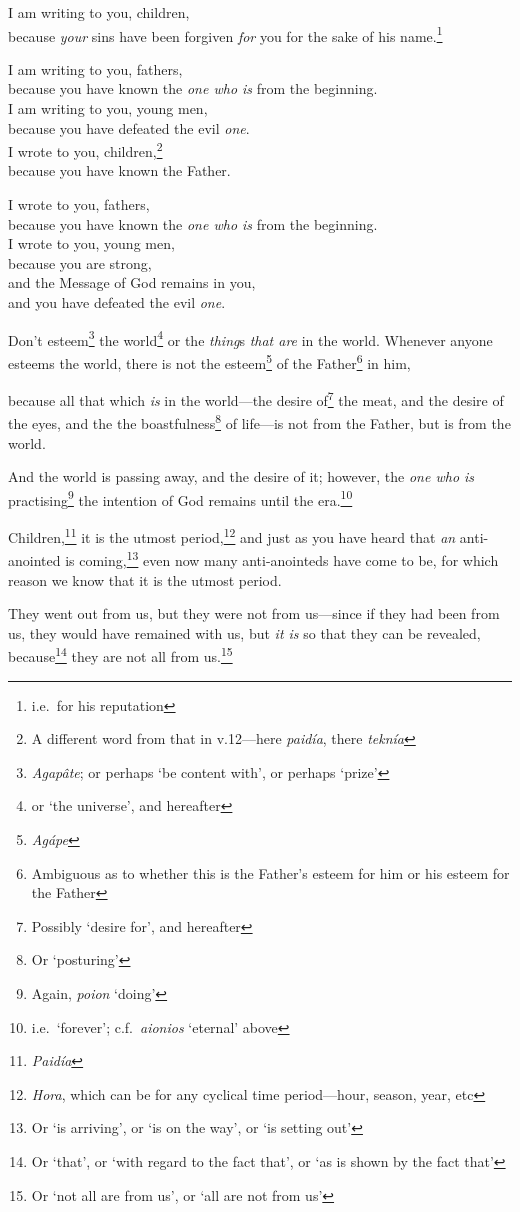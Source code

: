 \documentclass[article]{memoir}%
\newcounter{vnum}
\newcommand{\vnum}{%
	\textsuperscript{\thevnum}%
	\addtocounter{vnum}{1}%
}
\newcommand{\infer}[1]{\textit{#1}}
\newcommand{\focus}[1]{{#1}}
\newcommand{\lx}[1]{\textit{#1}}
\newcommand{\lxx}[2]{\textit{#1} `#2'}
\begin{document}
\indent \vnum I am writing to you, children,\\
\indent \indent because \infer{your} sins have been forgiven \infer{for} you for the sake of his name.\footnote{i.e.\ for his reputation} \\
\indent \vnum I am writing to you, fathers,\\
\indent \indent because you have known the \infer{one who is} from the beginning.\\
\indent I am writing to you, young men,\\
\indent \indent because you have defeated the evil \infer{one}.\\
\indent I wrote to you, children,\footnote{A different word from that in v.12---here \lx{paidía}, there \lx{teknía}}\\
\indent \indent because you have known the Father.\\
\indent \vnum I wrote to you, fathers,\\
\indent \indent because you have known the \infer{one who is} from the beginning.\\
\indent I wrote to you, young men,\\
\indent \indent because you are strong,\\
\indent \indent \indent and the Message of God remains in you,\\
\indent \indent \indent and you have defeated the evil \infer{one}.

\vnum Don't esteem\footnote{\lx{Agapâte}; or perhaps `be content with', or perhaps `prize'} the world\footnote{or `the universe', and hereafter} or the \infer{thing}s\infer{ that are} in the world. Whenever anyone esteems the world, there is not the esteem\footnote{\lx{Agápe}} of the Father\footnote{Ambiguous as to whether this is the Father's esteem for him or his esteem for the Father} in him, \vnum because all that which \infer{is} in the world---the desire of\footnote{Possibly `desire for', and hereafter} the meat, and the desire of the eyes, and the the boastfulness\footnote{Or `posturing'} of life---is \focus{not} from the Father, but is \focus{from the world}. \vnum And the world is passing away, and the desire of it; however, the \infer{one who is} practising\footnote{Again, \lxx{poion}{doing}} the intention of God remains until the era.\footnote{i.e.\ `forever'; c.f.\ \lxx{aionios}{eternal} above}

\vnum Children,\footnote{\lx{Paidía}} it is the utmost period,\footnote{\lx{Hora}, which can be for any cyclical time period---hour, season, year, etc} and just as you have heard that \infer{an} anti-anointed is coming,\footnote{Or `is arriving', or `is on the way', or `is setting out'} even now many anti-anointeds have come to be, for which reason we know that it is the utmost period. \vnum They went out from us, but they were not from us---since if they had been from us, they would have remained with us, but \infer{it is} so that they can be revealed, because\footnote{Or `that', or `with regard to the fact that', or `as is shown by the fact that'} they are not all from us.\footnote{Or `not all are from us', or `all are not from us'}
\end{document}
